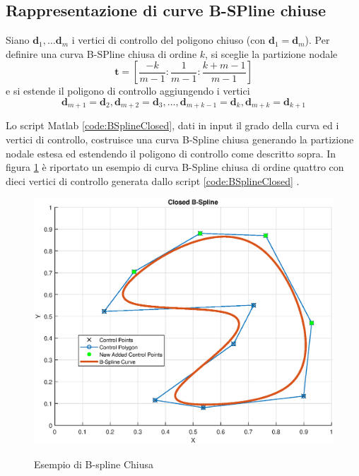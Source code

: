 \documentclass[a4paper, 12pt]{article}
\begin{document}


\subsection{Rappresentazione di curve B-SPline chiuse}
Siano $\mathbf{d}_1,\dots \mathbf{d}_m$ i vertici di controllo del poligono chiuso (con $\mathbf{d}_1 = \mathbf{d}_m$). 
Per definire una curva B-SPline chiusa di ordine $k$, si sceglie la partizione nodale $$\mathbf{t} = \left[ \frac{-k}{m-1} : \frac{1}{m-1} : \frac{k+m-1}{m-1} \right]$$
e si estende il poligono di controllo  aggiungendo i vertici $$\mathbf{d}_{m+1} = \mathbf{d}_2,\mathbf{d}_{m+2} = \mathbf{d}_3, \dots, \mathbf{d}_{m+k-1} = \mathbf{d}_k, \mathbf{d}_{m+k} = \mathbf{d}_{k+1} $$

Lo script Matlab \ref{code:BSplineClosed}, dati in input il grado della curva ed i vertici di controllo, costruisce una curva B-Spline chiusa generando la partizione nodale estesa ed estendendo il poligono di controllo come descritto sopra. In figura \ref{fig:BSplineClosed} è riportato un esempio di curva B-Spline chiusa di ordine quattro con dieci vertici di controllo generata dallo script \ref{code:BSplineClosed} .



\begin{figure}[!]
	\centering
	\caption{Esempio di B-spline Chiusa}
	\includegraphics[scale=0.55]{plot_closed.eps}
	\label{fig:BSplineClosed}
\end{figure}
\end{document}
